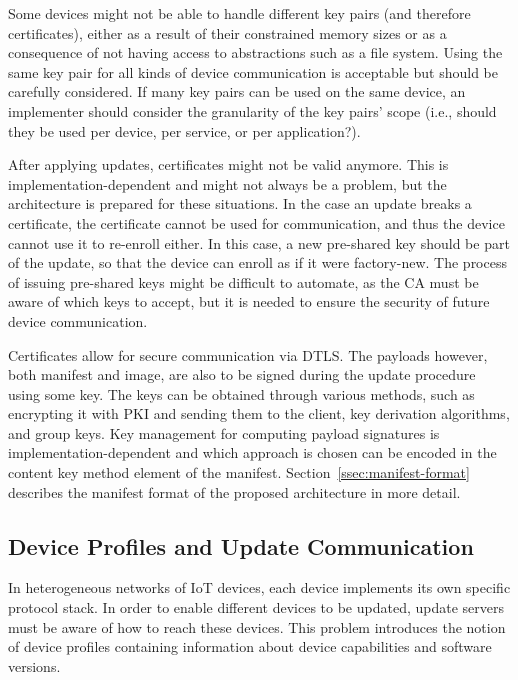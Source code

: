 \documentclass[0-thesis.tex]{subfiles}
\begin{document}
Some devices might not be able to handle different key pairs (and therefore certificates),
either as a result of their constrained memory sizes or as a consequence of not having
access to abstractions such as a file system. Using the same key pair for all kinds of
device communication is acceptable but should be carefully considered. If many key pairs
can be used on the same device, an implementer should consider the granularity of the key
pairs' scope (i.e., should they be used per device, per service, or per application?).

After applying updates, certificates might not be valid anymore. This is
implementation-dependent and might not always be a problem, but the architecture is
prepared for these situations. In the case an update breaks a certificate, the certificate
cannot be used for communication, and thus the device cannot use it to re-enroll either.
In this case, a new pre-shared key should be part of the update, so that the device can
enroll as if it were factory-new. The process of issuing pre-shared keys might be difficult
to automate, as the CA must be aware of which keys to accept, but it is needed to ensure
the security of future device communication.

Certificates allow for secure communication via DTLS. The payloads however, both manifest
and image, are also to be signed during the update procedure using some key. The keys can
be obtained through various methods, such as encrypting it with PKI and sending them to
the client, key derivation algorithms, and group keys. Key management for computing
payload signatures is implementation-dependent and which approach is chosen can be encoded
in the content key method element of the manifest. Section~\ref{ssec:manifest-format}
describes the manifest format of the proposed architecture in more detail.

\subsection{Device Profiles and Update Communication}
\label{ssec:communication}
In heterogeneous networks of IoT devices, each device implements its own specific protocol
stack. In order to enable different devices to be updated, update servers must be aware of
how to reach these devices. This problem introduces the notion of device profiles
containing information about device capabilities and software versions. 
\end{document}
